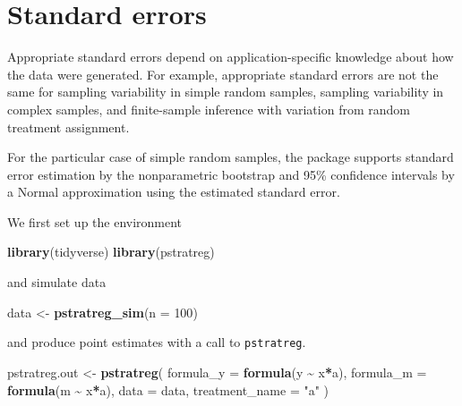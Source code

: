 \documentclass[
]{book}
\newenvironment{Shaded}{\begin{snugshade}}{\end{snugshade}}
\newcommand{\AttributeTok}[1]{\textcolor[rgb]{0.13,0.29,0.53}{#1}}
\newcommand{\DecValTok}[1]{\textcolor[rgb]{0.00,0.00,0.81}{#1}}
\newcommand{\FunctionTok}[1]{\textcolor[rgb]{0.13,0.29,0.53}{\textbf{#1}}}
\newcommand{\NormalTok}[1]{#1}
\newcommand{\OtherTok}[1]{\textcolor[rgb]{0.56,0.35,0.01}{#1}}
\newcommand{\SpecialCharTok}[1]{\textcolor[rgb]{0.81,0.36,0.00}{\textbf{#1}}}
\newcommand{\StringTok}[1]{\textcolor[rgb]{0.31,0.60,0.02}{#1}}
\begin{document}
\hypertarget{standard-errors}{%
\chapter{Standard errors}\label{standard-errors}}

Appropriate standard errors depend on application-specific knowledge about how the data were generated. For example, appropriate standard errors are not the same for sampling variability in simple random samples, sampling variability in complex samples, and finite-sample inference with variation from random treatment assignment.

For the particular case of simple random samples, the package supports standard error estimation by the nonparametric bootstrap and 95\% confidence intervals by a Normal approximation using the estimated standard error.

We first set up the environment

\begin{Shaded}
\begin{Highlighting}[]
\FunctionTok{library}\NormalTok{(tidyverse)}
\FunctionTok{library}\NormalTok{(pstratreg)}
\end{Highlighting}
\end{Shaded}

and simulate data

\begin{Shaded}
\begin{Highlighting}[]
\NormalTok{data }\OtherTok{\textless{}{-}} \FunctionTok{pstratreg\_sim}\NormalTok{(}\AttributeTok{n =} \DecValTok{100}\NormalTok{)}
\end{Highlighting}
\end{Shaded}

and produce point estimates with a call to \texttt{pstratreg}.

\begin{Shaded}
\begin{Highlighting}[]
\NormalTok{pstratreg.out }\OtherTok{\textless{}{-}} \FunctionTok{pstratreg}\NormalTok{(}
  \AttributeTok{formula\_y =} \FunctionTok{formula}\NormalTok{(y }\SpecialCharTok{\textasciitilde{}}\NormalTok{ x}\SpecialCharTok{*}\NormalTok{a),}
  \AttributeTok{formula\_m =} \FunctionTok{formula}\NormalTok{(m }\SpecialCharTok{\textasciitilde{}}\NormalTok{ x}\SpecialCharTok{*}\NormalTok{a),}
  \AttributeTok{data =}\NormalTok{ data,}
  \AttributeTok{treatment\_name =} \StringTok{"a"}
\NormalTok{)}
\end{Highlighting}
\end{Shaded}
\end{document}
